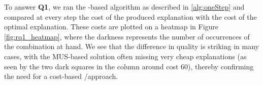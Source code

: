 To answer \textbf{Q1}, we ran the -based algorithm as described in \cref{alg:oneStep} and compared at every step the cost of the produced explanation with the cost of the optimal explanation. 
% 
These costs are plotted on a heatmap in Figure \ref{fig:rq1_heatmap}, where the darkness represents the number of occurrences of the combination at hand. 
We see that the difference in quality is striking in many cases, with the MUS-based solution often missing very cheap explanations (as seen by the two dark squares in the column around cost 60), thereby confirming the need for a cost-based \omus/\comus approach.
